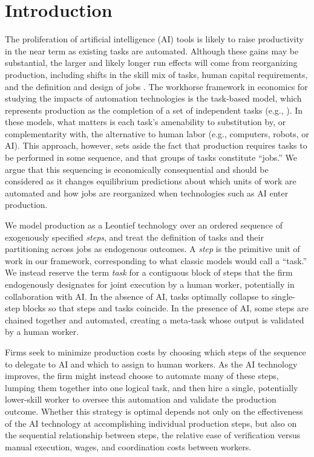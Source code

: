 \section{Introduction}

The proliferation of artificial intelligence (AI) tools is likely to raise productivity in the near term as existing tasks are automated.
Although these gains may be substantial, the larger and likely longer run effects will come from reorganizing production, including shifts in the skill mix of tasks, human capital requirements, and the definition and design of jobs \citep{brynjolfsson2021productivity}. 
The workhorse framework in economics for studying the impacts of automation technologies is the task-based model, which represents production as the completion of a set of independent tasks (e.g., \citealp{autor2003skill, acemoglu2011skills, acemoglu2018, acemoglu2019automation, acemoglu2022tasks}). 
In these models, what matters is each task's amenability to substitution by, or complementarity with, the alternative to human labor (e.g., computers, robots, or AI). 
This approach, however, sets aside the fact that production requires tasks to be performed in some sequence, and that groups of tasks constitute ``jobs.'' 
We argue that this sequencing is economically consequential and should be considered as it changes equilibrium predictions about which units of work are automated and how jobs are reorganized when technologies such as AI enter production. 

We model production as a Leontief technology over an ordered sequence of exogenously specified \emph{steps}, and treat the definition of tasks and their partitioning across jobs as endogenous outcomes.
A \emph{step} is the primitive unit of work in our framework, corresponding to what classic models would call a ``task.''
We instead reserve the term \emph{task} for a contiguous block of steps that the firm endogenously designates for joint execution by a human worker, potentially in collaboration with AI.
In the absence of AI, tasks optimally collapse to single-step blocks so that steps and tasks coincide.  In the presence of AI, some steps are chained together and automated, creating a meta-task whose output is validated by a human worker.

Firms seek to minimize production costs by choosing which steps of the sequence to delegate to AI and which to assign to human workers.
As the AI technology improves, the firm might instead choose to automate many of these steps, lumping them together into one logical task, and then hire a single, potentially lower-skill worker to oversee this automation and validate the production outcome.
Whether this strategy is optimal depends not only on the effectiveness of the AI technology at accomplishing individual production steps, but also on the sequential relationship between steps, the relative ease of verification versus manual execution, wages, and coordination costs between workers.

